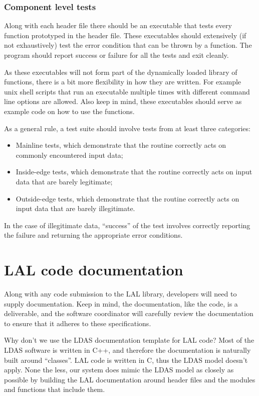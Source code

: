 \documentclass[]{ligodcc}
\begin{document}
\subsubsection{Component level tests}
Along with each header file there should be an executable that tests
every function prototyped in the header file.  These executables
should extensively (if not exhaustively) test the error condition that
can be thrown by a function. The program  should report success or
failure for all the tests and exit cleanly.

As these executables will not form part of the dynamically loaded
library of functions, there is a bit more flexibility in how they are
written.  For example unix shell scripts that run an executable
multiple times with different command line options are allowed. Also
keep in mind, these executables should serve as example code on  how
to use the functions.

As a general rule, a test suite should involve tests from at least
three categories:
\begin{itemize}
   \item
   Mainline tests, which demonstrate that the routine correctly
   acts on commonly encountered input data;
   \item
   Inside-edge tests, which demonstrate that the routine
   correctly acts on input data that are barely legitimate;
   \item
   Outside-edge tests, which demonstrate that the routine
   correctly acts on input data that are barely illegitimate.
\end{itemize}

In the case of illegitimate data, ``success'' of the test involves
correctly reporting the failure and  returning the appropriate error
conditions.

\section{LAL code documentation}
\label{sec:laldocumentation}

Along with any code submission to the LAL library, developers  will
need to supply documentation. Keep in mind, the documentation, like
the code, is a deliverable, and the software coordinator will
carefully review the documentation to ensure that  it adheres to these
specifications.

Why don't we use the LDAS documentation template for LAL code? Most of
the LDAS software is written in C++, and therefore the documentation
is naturally built around ``classes''. LAL code is written in C, thus
the LDAS model doesn't apply. None the less, our system does mimic the
LDAS model as closely as possible by building the LAL documentation
around header files and the modules and functions that include them.
\end{document}
